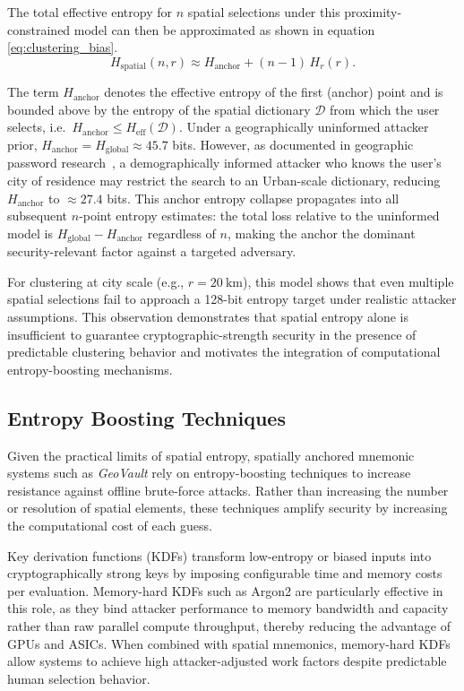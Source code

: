 \documentclass[journal,article,accept,pdftex,moreauthors]{Definitions/mdpi}
\begin{document}
The total effective entropy for $n$ spatial selections under this proximity-constrained model can then be approximated as shown in equation \ref{eq:clustering_bias}.
\begin{equation}
H_{\text{spatial}}(n,r) \approx H_{\text{anchor}} + (n-1)\,H_r(r).
\label{eq:clustering_bias}
\end{equation}

The term $H_{\text{anchor}}$ denotes the effective entropy of the first (anchor) point and is bounded above by the entropy of the spatial dictionary $\mathcal{D}$ from which the user selects, i.e.\ $H_{\text{anchor}} \le H_{\text{eff}}(\mathcal{D})$. Under a geographically uninformed attacker prior, $H_{\text{anchor}} = H_{\text{global}} \approx 45.7$ bits. However, as documented in geographic password research~\cite{Sun2012, Thorpe2013, AlAmeen2014}, a demographically informed attacker who knows the user's city of residence may restrict the search to an Urban-scale dictionary, reducing $H_{\text{anchor}}$ to $\approx 27.4$ bits. This anchor entropy collapse propagates into all subsequent $n$-point entropy estimates: the total loss relative to the uninformed model is $H_{\text{global}} - H_{\text{anchor}}$ regardless of $n$, making the anchor the dominant security-relevant factor against a targeted adversary.

For clustering at city scale (e.g., $r = 20~\text{km}$), this model shows that even multiple spatial selections fail to approach a 128-bit entropy target under realistic attacker assumptions. This observation demonstrates that spatial entropy alone is insufficient to guarantee cryptographic-strength security in the presence of predictable clustering behavior and motivates the integration of computational entropy-boosting mechanisms.


\subsection{Entropy Boosting Techniques}

Given the practical limits of spatial entropy, spatially anchored mnemonic systems such as \textit{GeoVault} rely on entropy-boosting techniques to increase resistance against offline brute-force attacks. Rather than increasing the number or resolution of spatial elements, these techniques amplify security by increasing the computational cost of each guess.

Key derivation functions (KDFs) transform low-entropy or biased inputs into cryptographically strong keys by imposing configurable time and memory costs per evaluation. Memory-hard KDFs such as Argon2 are particularly effective in this role, as they bind attacker performance to memory bandwidth and capacity rather than raw parallel compute throughput, thereby reducing the advantage of GPUs and ASICs. When combined with spatial mnemonics, memory-hard KDFs allow systems to achieve high attacker-adjusted work factors despite predictable human selection behavior.
\end{document}

